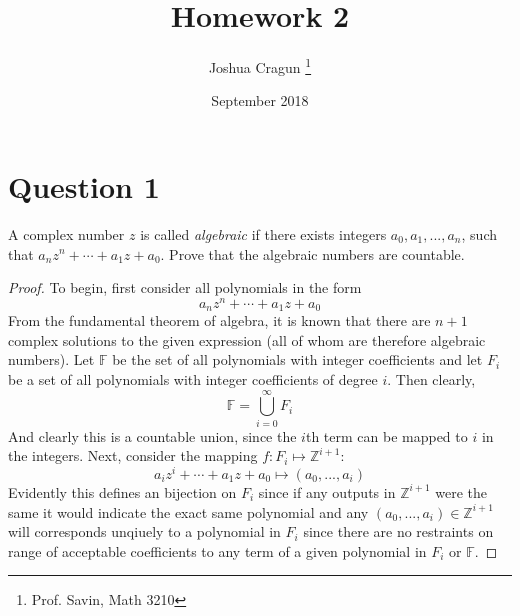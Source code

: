 \documentclass[12pt, letterpaper]{article}
\title{Homework 2}
\author{Joshua Cragun \thanks{Prof. Savin, Math 3210}}
\date{September 2018}
\begin{document}
\begin{titlepage}
\maketitle
\end{titlepage}

\section*{Question 1}
A complex number $z$ is called \textit{algebraic} if there exists integers $a_0, a_1, ..., a_n$,
such that $a_n z^n + \cdots + a_1 z + a_0$. Prove that the algebraic numbers are countable.

\begin{proof}
  To begin, first consider all polynomials in the form
  $$a_n z^n + \cdots + a_1 z + a_0$$
  From the fundamental theorem of algebra, it is known that there are $n + 1$ complex solutions to the given expression (all of whom are therefore algebraic numbers).
  Let $\mathbb{F}$ be the set of all polynomials with integer coefficients and let $F_i$ be a set of all polynomials with integer coefficients of degree $i$. Then clearly,
  $$ \mathbb{F} = \bigcup\limits_{i = 0}^{\infty} F_i$$
  And clearly this is a countable union, since the $i$th term can be mapped to $i$ in the integers. Next, consider the mapping $f: F_i \mapsto \mathbb{Z}^{i+1}$:
  $$ a_i z^i + \cdots + a_1 z + a_0 \mapsto (a_0, ..., a_i)$$
  Evidently this defines an bijection on $F_i$ since if any outputs in $\mathbb{Z}^{i+1}$ were the same it would indicate the exact same polynomial
  and any $(a_0, ..., a_i) \in \mathbb{Z}^{i+1}$ will corresponds unqiuely to a polynomial in $F_i$ since there are no restraints on range of acceptable coefficients
  to any term of a given polynomial in $F_i$ or $\mathbb{F}$. 

\end{proof}
\end{document}

